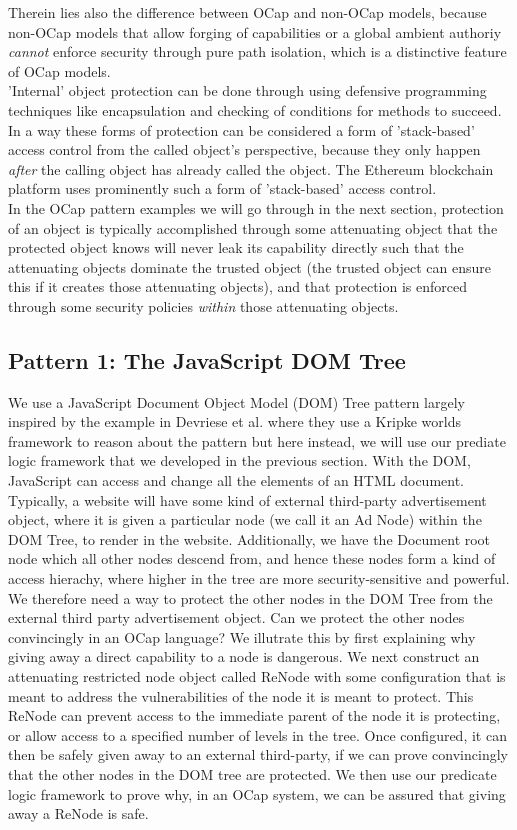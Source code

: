 \documentclass[a4paper,11pt, twoside,twocolumn]{article}
\begin{document}
Therein lies also the difference between OCap and non-OCap models, because non-OCap models that allow forging of capabilities or a global ambient authoriy \textit{cannot} enforce security through pure path isolation, which is a distinctive feature of OCap models.\\

'Internal' object protection can be done through using defensive programming techniques like encapsulation and checking of conditions for methods to succeed. In a way these forms of protection can be considered a form of 'stack-based' access control from the called object's perspective, because they only happen \textit{after} the calling object has already called the object. The Ethereum blockchain platform uses prominently such a form of 'stack-based' access control.\\

In the OCap pattern examples we will go through in the next section, protection of an object is typically accomplished through some attenuating object that the protected object knows will never leak its capability directly such that the attenuating objects dominate the trusted object (the trusted object can ensure this if it creates those attenuating objects), and that protection is enforced through some security policies \textit{within} those attenuating objects.

\newpage
\subsection{Pattern 1: The JavaScript DOM Tree}
We use a JavaScript Document Object Model (DOM) Tree pattern largely inspired by the example in Devriese et al.\cite{devriese2016} where they use a Kripke worlds framework to reason about the pattern but here instead, we will use our prediate logic framework that we developed in the previous section. With the DOM, JavaScript can access and change all the elements of an HTML document. Typically, a website will have some kind of external third-party advertisement object, where it is given a particular node (we call it an Ad Node) within the DOM Tree, to render in the website. Additionally, we have the Document root node which all other nodes descend from, and hence these nodes form a kind of access hierachy, where higher in the tree are more security-sensitive and powerful. We therefore need a way to protect the other nodes in the DOM Tree from the external third party advertisement object. Can we protect the other nodes convincingly in an OCap language? We illutrate this by first explaining why giving away a direct capability to a node is dangerous. We next construct an attenuating restricted node object called ReNode with some configuration that is meant to address the vulnerabilities of the node it is meant to protect. This ReNode can prevent access to the immediate parent of the node it is protecting, or allow access to a specified number of levels in the tree. Once configured, it can then be safely given away to an external third-party, if we can prove convincingly that the other nodes in the DOM tree are protected. We then use our predicate logic framework to prove why, in an OCap system, we can be assured that giving away a ReNode is safe.\\
\end{document}
